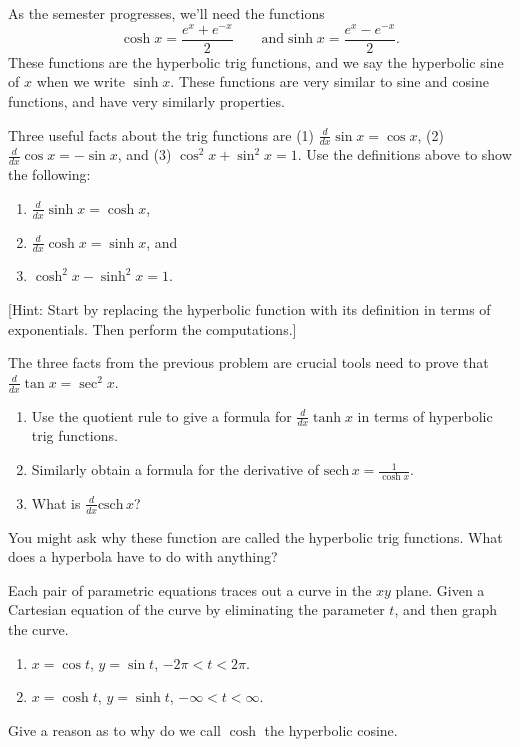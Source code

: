 As the semester progresses, we'll need the functions 
$$\cosh x = \frac{e^x+e^{-x}}{2}\quad\quad \text{and} \sinh x= \frac{e^x-e^{-x}}{2}.$$  
These functions are the hyperbolic trig functions, and we say the hyperbolic sine of $x$ when we write $\sinh x$.
These functions are very similar to sine and cosine functions, and have very similarly properties.  

\begin{problem}
Three useful facts about the trig functions are 
(1) $\frac{d}{dx}\sin x=\cos x$, 
(2) $\frac{d}{dx}\cos x=-\sin x$, and 
(3) $\cos^2 x+\sin^2 x = 1$. 
Use the definitions above to show the following:
\begin{enumerate}
\item $\frac{d}{dx}\sinh x=\cosh x$, 
\item $\frac{d}{dx}\cosh x=\sinh x$, and 
\item $\cosh^2 x-\sinh^2 x = 1$. 
\end{enumerate}
[Hint: Start by replacing the hyperbolic function with its definition in terms of exponentials. Then perform the computations.]
\end{problem}

\begin{problem}
The three facts from the previous problem are crucial tools need to prove that $\frac{d}{dx}\tan x =\sec^2x$. 
\begin{enumerate}
 \item Use the quotient rule to give a formula for $\frac{d}{dx}\tanh x$ in terms of hyperbolic trig functions. 
 \item Similarly obtain a formula for the derivative of $\text{sech}\, x = \frac{1}{\cosh x}$. 
 \item What is $\frac{d}{dx}\text{csch}\, x$?
\end{enumerate}
\end{problem}

You might ask why these function are called the hyperbolic trig functions.  What does a hyperbola have to do with anything?
\begin{problem}
Each pair of parametric equations traces out a curve in the $xy$ plane.  Given a Cartesian equation of the curve by eliminating the parameter $t$, and then graph the curve. 
\begin{enumerate}
 \item $x=\cos t$, $y=\sin t$, $-2\pi<t<2\pi$.
 \item $x=\cosh t$, $y=\sinh t$, $-\infty<t<\infty$.
\end{enumerate}
Give a reason as to why do we call $\cosh$ the hyperbolic cosine.
\end{problem}


